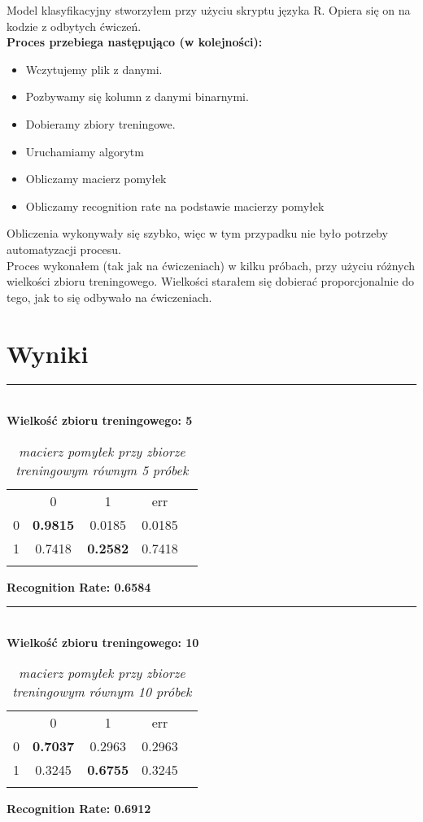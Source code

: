 \documentclass[a4paper,12pt]{article}
\newcommand{\linia}{\rule{\linewidth}{0.5pt}}
\theoremstyle{mytheor}
\begin{document}
Model klasyfikacyjny stworzyłem przy użyciu skryptu języka R. Opiera się on na kodzie z odbytych ćwiczeń.\\

\textbf{Proces przebiega następująco (w kolejności):}
\begin{itemize}
 \item Wczytujemy plik z danymi.
 \item Pozbywamy się kolumn z danymi binarnymi.
 \item Dobieramy zbiory treningowe.
 \item Uruchamiamy algorytm
 \item Obliczamy macierz pomyłek
 \item Obliczamy recognition rate na podstawie macierzy pomyłek
\end{itemize}

Obliczenia wykonywały się szybko, więc w tym przypadku nie było potrzeby automatyzacji procesu.\\

Proces wykonałem (tak jak na ćwiczeniach) w kilku próbach, przy użyciu różnych wielkości zbioru treningowego. Wielkości starałem się dobierać proporcjonalnie do tego, jak to się odbywało na ćwiczeniach.

\section*{Wyniki}
\linia\\
\textbf{Wielkość zbioru treningowego: 5}
\begin{table}[H]
\begin{tabular}{ccccc}
 & 0 & 1 & err  &  \\
0 & \textbf{0.9815} & 0.0185 & 0.0185  \\
1 & 0.7418 & \textbf{0.2582} & 0.7418 \\
&&&
\end{tabular}
\caption{\textit{macierz pomyłek przy zbiorze treningowym równym 5 próbek}}
\label{tab:1}
\end{table}
\textbf{Recognition Rate: 0.6584}\\

\linia\\
\textbf{Wielkość zbioru treningowego: 10}
\begin{table}[H]
\begin{tabular}{ccccc}
 & 0 & 1 & err  &  \\
0 & \textbf{0.7037} & 0.2963 & 0.2963  \\
1 & 0.3245 & \textbf{0.6755} & 0.3245 \\
&&&
\end{tabular}
\caption{\textit{macierz pomyłek przy zbiorze treningowym równym 10 próbek}}
\label{tab:2}
\end{table}
\textbf{Recognition Rate: 0.6912}\\
\end{document}

